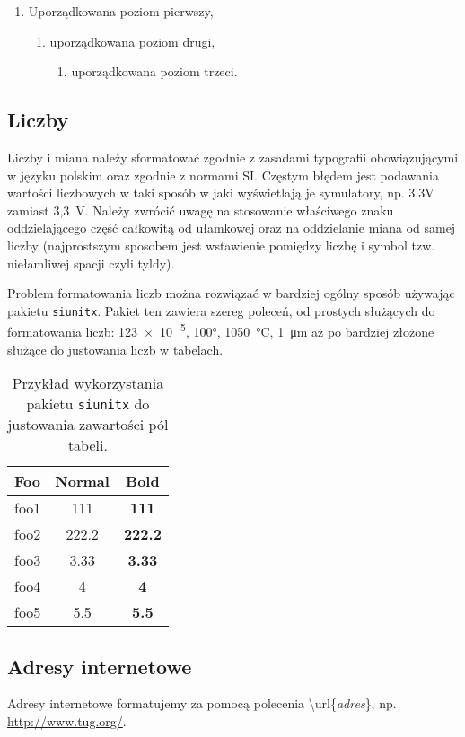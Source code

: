 \begin{enumerate}
\item  Uporządkowana poziom pierwszy,
\begin{enumerate}
\item uporządkowana poziom drugi,
\begin{enumerate}
\item uporządkowana poziom trzeci.
\end{enumerate}
\end{enumerate}
\end{enumerate}




\subsection{Liczby}
\label{sec:liczby}
Liczby i miana należy sformatować zgodnie z zasadami typografii obowiązującymi w języku polskim oraz zgodnie z normami SI. Częstym błędem jest podawania wartości liczbowych w taki sposób w jaki wyświetlają je symulatory, np. 3.3V zamiast 3,3~V.  Należy zwrócić uwagę na stosowanie właściwego znaku oddzielającego część całkowitą od ułamkowej oraz na oddzielanie miana od samej liczby (najprostszym sposobem jest wstawienie pomiędzy liczbę i symbol tzw. niełamliwej spacji czyli tyldy). 

Problem formatowania liczb można rozwiązać w bardziej ogólny sposób używając pakietu \texttt{siunitx}.  Pakiet ten zawiera szereg poleceń, od prostych służących do formatowania liczb: \num{123e-5}, \ang{100}, \SI{1050}{\degreeCelsius}, \SI{1}{\micro\meter} aż po bardziej złożone służące do justowania liczb w tabelach.
\begin{table}[!h]
\caption{Przykład wykorzystania pakietu \texttt{siunitx} do justowania zawartości pól tabeli.}
\centering
  \begin{tabular}{@{}lS[table-format=3.2]>{\bfseries}S[table-format=3.2]@{}}
    \toprule
    \textbf{Foo} & \textbf{Normal} & \textbf{Bold} \\
    \midrule
    foo1 & 111 & 111 \\
    foo2 & 222.2 & 222.2 \\
    foo3 & 3.33 & 3.33 \\
    foo4 & 4 & 4 \\
    foo5 & 5.5 & 5.5 \\
    \bottomrule
  \end{tabular}
\end{table}


\subsection{Adresy internetowe}
Adresy internetowe formatujemy za pomocą polecenia \textbackslash url\{\textit{adres}\}, np. \url{http://www.tug.org/}.

